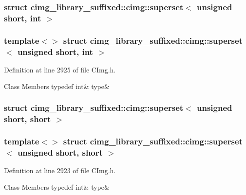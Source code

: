 \subsubsection{struct cimg\+\_\+library\+\_\+suffixed\+:\+:cimg\+:\+:superset$<$ unsigned short, int $>$}
\subsubsection*{template$<$$>$\newline
struct cimg\+\_\+library\+\_\+suffixed\+::cimg\+::superset$<$ unsigned short, int $>$}



Definition at line 2925 of file C\+Img.\+h.

\begin{DoxyFields}{Class Members}
\mbox{\label{namespacecimg__library__suffixed_1_1cimg_acb828d363e7f784d3c087fdaa27a6bd9}} 
typedef int&
type&
\\
\hline

\end{DoxyFields}
\label{structcimg__library__suffixed_1_1cimg_1_1superset_3_01unsigned_01short_00_01short_01_4}
\subsubsection{struct cimg\+\_\+library\+\_\+suffixed\+:\+:cimg\+:\+:superset$<$ unsigned short, short $>$}
\subsubsection*{template$<$$>$\newline
struct cimg\+\_\+library\+\_\+suffixed\+::cimg\+::superset$<$ unsigned short, short $>$}



Definition at line 2923 of file C\+Img.\+h.

\begin{DoxyFields}{Class Members}
\mbox{\label{namespacecimg__library__suffixed_1_1cimg_a605f030f945625f24f5f81624c59a3b3}} 
typedef int&
type&
\\
\hline

\end{DoxyFields}
\label{structcimg__library__suffixed_1_1cimg_1_1superset_3_01unsigned_01short_00_01signed_01char_01_4}
